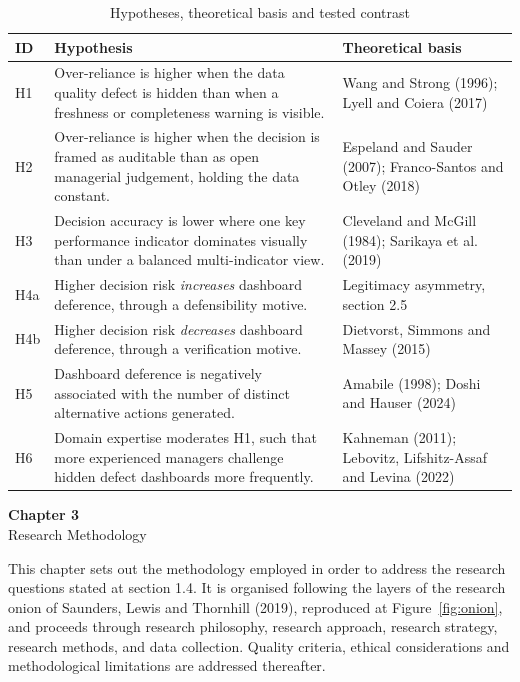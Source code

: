 \documentclass[12pt,a4paper]{article}
\newcounter{chapno}
\newcommand{\chapt}[2]{%
  \newpage
  \setcounter{chapno}{#1}%
  \setcounter{section}{0}\setcounter{subsection}{0}%
  \setcounter{figure}{0}\setcounter{table}{0}%
  \addtocontents{toc}{\protect\vspace{9pt}}%
  \addtocontents{toc}{\protect\noindent{\protect\bfseries Chapter #1:} #2\protect\par\protect\vspace{3pt}}%
  \begin{center}
    {\large\bfseries Chapter #1}\\[8pt]
    {\large #2}
  \end{center}
  \vspace{14pt}%
}
\begin{document}
\begin{table}[H]
\centering\small
\caption{Hypotheses, theoretical basis and tested contrast}
\label{tab:hyp}
\begin{tabularx}{\textwidth}{@{}p{0.9cm} X p{4.0cm}@{}}
\toprule
\textbf{ID} & \textbf{Hypothesis} & \textbf{Theoretical basis} \\
\midrule
H1 & Over-reliance is higher when the data quality defect is hidden than when a freshness or completeness
warning is visible. & Wang and Strong (1996); Lyell and Coiera (2017) \\
H2 & Over-reliance is higher when the decision is framed as auditable than as open managerial judgement,
holding the data constant. & Espeland and Sauder (2007); Franco-Santos and Otley (2018) \\
H3 & Decision accuracy is lower where one key performance indicator dominates visually than under a
balanced multi-indicator view. & Cleveland and McGill (1984); Sarikaya et al. (2019) \\
H4a & Higher decision risk \emph{increases} dashboard deference, through a defensibility motive. &
Legitimacy asymmetry, section 2.5 \\
H4b & Higher decision risk \emph{decreases} dashboard deference, through a verification motive. &
Dietvorst, Simmons and Massey (2015) \\
H5 & Dashboard deference is negatively associated with the number of distinct alternative actions
generated. & Amabile (1998); Doshi and Hauser (2024) \\
H6 & Domain expertise moderates H1, such that more experienced managers challenge hidden defect dashboards
more frequently. & Kahneman (2011); Lebovitz, Lifshitz-Assaf and Levina (2022) \\
\bottomrule
\end{tabularx}
\end{table}

\chapt{3}{Research Methodology}

This chapter sets out the methodology employed in order to address the research questions stated
at section 1.4. It is organised following the layers of the research onion of Saunders, Lewis and
Thornhill (2019), reproduced at Figure~\ref{fig:onion}, and proceeds through research philosophy,
research approach, research strategy, research methods, and data collection. Quality criteria,
ethical considerations and methodological limitations are addressed thereafter.
\end{document}
